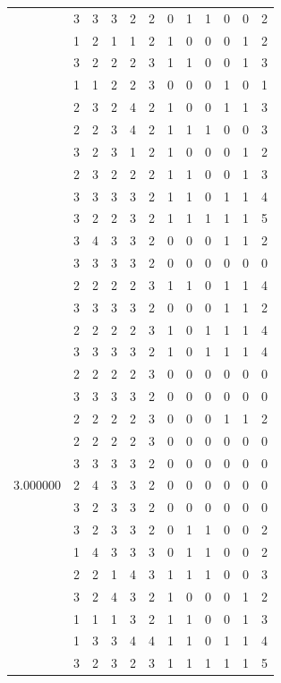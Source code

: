 \documentclass[]{book}
\theoremstyle{definition}
\theoremstyle{definition}
\theoremstyle{definition}
\theoremstyle{remark}
\begin{document}
\begin{table}
{\begin{tabular}[t]{rrrrrrrrrrrr}
 & 3 & 3 & 3 & 2 & 2 & 0 & 1 & 1 & 0 & 0 & 2\\
 & 1 & 2 & 1 & 1 & 2 & 1 & 0 & 0 & 0 & 1 & 2\\
 & 3 & 2 & 2 & 2 & 3 & 1 & 1 & 0 & 0 & 1 & 3\\
 & 1 & 1 & 2 & 2 & 3 & 0 & 0 & 0 & 1 & 0 & 1\\
 & 2 & 3 & 2 & 4 & 2 & 1 & 0 & 0 & 1 & 1 & 3\\
 & 2 & 2 & 3 & 4 & 2 & 1 & 1 & 1 & 0 & 0 & 3\\
 & 3 & 2 & 3 & 1 & 2 & 1 & 0 & 0 & 0 & 1 & 2\\
 & 2 & 3 & 2 & 2 & 2 & 1 & 1 & 0 & 0 & 1 & 3\\
 & 3 & 3 & 3 & 3 & 2 & 1 & 1 & 0 & 1 & 1 & 4\\
 & 3 & 2 & 2 & 3 & 2 & 1 & 1 & 1 & 1 & 1 & 5\\
 & 3 & 4 & 3 & 3 & 2 & 0 & 0 & 0 & 1 & 1 & 2\\
 & 3 & 3 & 3 & 3 & 2 & 0 & 0 & 0 & 0 & 0 & 0\\
 & 2 & 2 & 2 & 2 & 3 & 1 & 1 & 0 & 1 & 1 & 4\\
 & 3 & 3 & 3 & 3 & 2 & 0 & 0 & 0 & 1 & 1 & 2\\
 & 2 & 2 & 2 & 2 & 3 & 1 & 0 & 1 & 1 & 1 & 4\\
 & 3 & 3 & 3 & 3 & 2 & 1 & 0 & 1 & 1 & 1 & 4\\
 & 2 & 2 & 2 & 2 & 3 & 0 & 0 & 0 & 0 & 0 & 0\\
 & 3 & 3 & 3 & 3 & 2 & 0 & 0 & 0 & 0 & 0 & 0\\
 & 2 & 2 & 2 & 2 & 3 & 0 & 0 & 0 & 1 & 1 & 2\\
 & 2 & 2 & 2 & 2 & 3 & 0 & 0 & 0 & 0 & 0 & 0\\
 & 3 & 3 & 3 & 3 & 2 & 0 & 0 & 0 & 0 & 0 & 0\\
3.000000 & 2 & 4 & 3 & 3 & 2 & 0 & 0 & 0 & 0 & 0 & 0\\
 & 3 & 2 & 3 & 3 & 2 & 0 & 0 & 0 & 0 & 0 & 0\\
 & 3 & 2 & 3 & 3 & 2 & 0 & 1 & 1 & 0 & 0 & 2\\
 & 1 & 4 & 3 & 3 & 3 & 0 & 1 & 1 & 0 & 0 & 2\\
 & 2 & 2 & 1 & 4 & 3 & 1 & 1 & 1 & 0 & 0 & 3\\
 & 3 & 2 & 4 & 3 & 2 & 1 & 0 & 0 & 0 & 1 & 2\\
 & 1 & 1 & 1 & 3 & 2 & 1 & 1 & 0 & 0 & 1 & 3\\
 & 1 & 3 & 3 & 4 & 4 & 1 & 1 & 0 & 1 & 1 & 4\\
 & 3 & 2 & 3 & 2 & 3 & 1 & 1 & 1 & 1 & 1 & 5\\

\end{tabular}}
\end{table}
\end{document}
